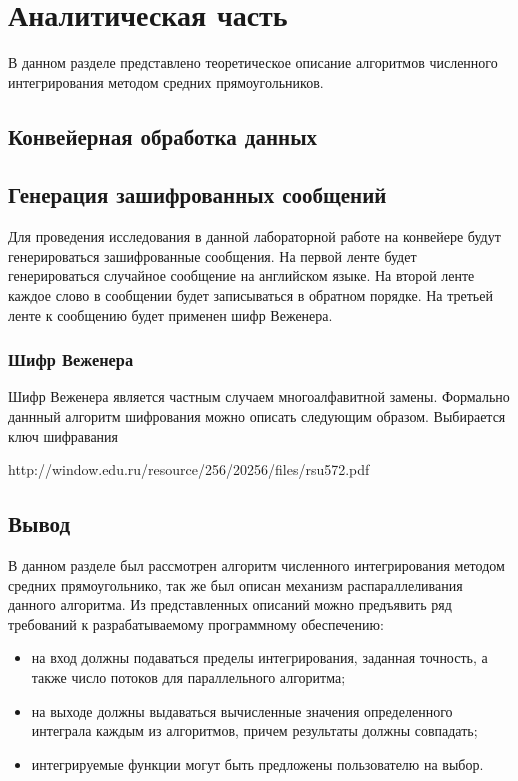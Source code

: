 \chapter{Аналитическая часть}

В данном разделе представлено теоретическое описание алгоритмов численного
интегрирования методом средних прямоугольников.

\section{Конвейерная обработка данных}

\section{Генерация зашифрованных сообщений}

Для проведения исследования в данной лабораторной работе на конвейере будут генерироваться зашифрованные сообщения. На первой ленте будет генерироваться случайное сообщение на английском языке. На второй ленте каждое слово в сообщении будет записываться в обратном порядке. На третьей ленте к сообщению будет применен шифр Веженера.

\subsection{Шифр Веженера}

Шифр Веженера является частным случаем многоалфавитной замены. Формально даннный алгоритм шифрования можно описать следующим образом. Выбирается ключ шифравания 

http://window.edu.ru/resource/256/20256/files/rsu572.pdf

\section{Вывод}

В данном разделе был рассмотрен алгоритм численного интегрирования методом
средних прямоугольнико, так же был описан механизм распараллеливания данного
алгоритма. Из представленных описаний можно предъявить ряд требований к
разрабатываемому программному обеспечению:
\begin{itemize}[left=\parindent]
    \item на вход должны подаваться пределы интегрирования, заданная точность,
          а также число потоков для параллельного алгоритма;
    \item на выходе должны выдаваться вычисленные значения определенного
          интеграла каждым из алгоритмов, причем результаты должны совпадать;
    \item интегрируемые функции могут быть предложены пользователю на выбор.
\end{itemize}
